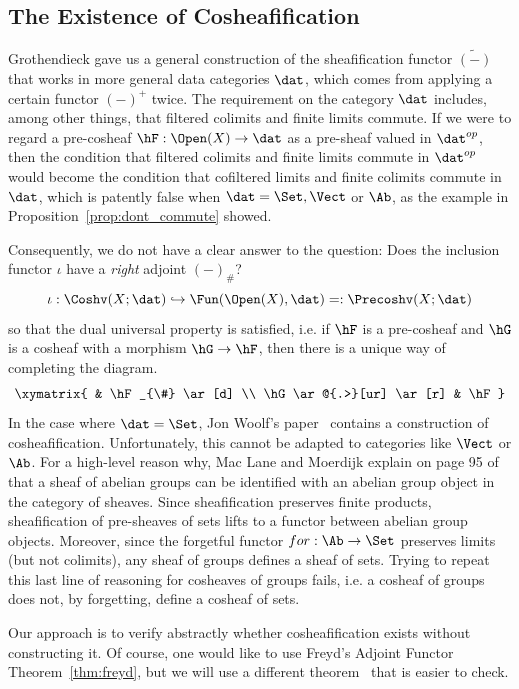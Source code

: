 \subsection{The Existence of Cosheafification}
\label{subsec:cosheafification}

Grothendieck gave us a general construction of the sheafification functor $\widetilde{(-)}$ that works in more general data categories $\dat$, which comes from applying a certain functor $(-)^{+}$ twice. The requirement on the category $\dat$ includes, among other things, that filtered colimits and finite limits commute. If we were to regard a pre-cosheaf $\hF:\Open(X)\to\dat$ as a pre-sheaf valued in $\dat^{op}$, then the condition that filtered colimits and finite limits commute in $\dat^{op}$ would become the condition that cofiltered limits and finite colimits commute in $\dat$, which is patently false when $\dat=\Set,\Vect$ or $\Ab$, as the example in Proposition~\ref{prop:dont_commute} showed.

Consequently, we do not have a clear answer to the question: Does the inclusion functor $\iota$ have a \emph{right} adjoint $(-)_{\#}$?
\[
\iota:\Coshv(X;\dat) \hookrightarrow \Fun(\Open(X),\dat)=:\Precoshv(X;\dat)
\]
so that the dual universal property is satisfied, i.e. if $\hF$ is a pre-cosheaf and $\hG$ is a cosheaf with a morphism $\hG\to\hF$, then there is a unique way of completing the diagram.
\[
\xymatrix{ & \hF_{\#} \ar[d] \\
\hG \ar@{.>}[ur] \ar[r] & \hF}
\]
In the case where $\dat=\Set$, Jon Woolf's paper~\cite{woolf} contains a construction of cosheafification. Unfortunately, this cannot be adapted to categories like $\Vect$ or $\Ab$. For a high-level reason why, Mac Lane and Moerdijk explain on page 95 of~\cite{mm-topos} that a sheaf of abelian groups can be identified with an abelian group object in the category of sheaves. Since sheafification preserves finite products, sheafification of pre-sheaves of sets lifts to a functor between abelian group objects. Moreover, since the forgetful functor $for:\Ab\to\Set$ preserves limits (but not colimits), any sheaf of groups defines a sheaf of sets. Trying to repeat this last line of reasoning for cosheaves of groups fails, i.e. a cosheaf of groups does not, by forgetting, define a cosheaf of sets.

Our approach is to verify abstractly whether cosheafification exists without constructing it. Of course, one would like to use Freyd's Adjoint Functor Theorem~\ref{thm:freyd}, but we will use a different theorem~\cite[Thm 6.28]{adamek-lpac} that is easier to check.

